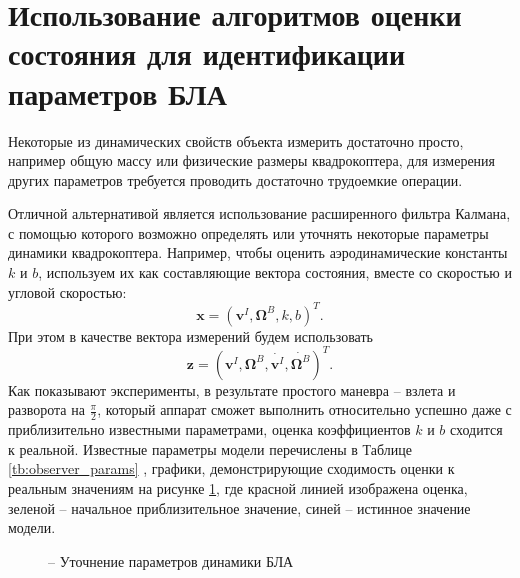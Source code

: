 \section{Использование алгоритмов оценки состояния для идентификации параметров БЛА}

Некоторые из динамических свойств объекта измерить достаточно просто, например общую массу или физические размеры квадрокоптера, для измерения других параметров требуется проводить достаточно трудоемкие операции.

Отличной альтернативой является использование расширенного фильтра Калмана, с помощью которого возможно определять или уточнять некоторые параметры динамики квадрокоптера. Например, чтобы оценить аэродинамические константы $k$ и $b$, используем их как составляющие вектора состояния, вместе со скоростью и угловой скоростью:
\begin{equation}
\bm x = (\bm v^I, \bm \Omega^B, k, b)^T.
\end{equation}
При этом в качестве вектора измерений будем использовать
\begin{equation}
\bm z = (\bm v^I, \bm \Omega^B, \dot{\bm v^I}, \dot{\bm \Omega^B})^T.
\end{equation}
Как показывают эксперименты, в результате простого маневра -- взлета и разворота на $\frac{\pi}{2}$, который аппарат сможет выполнить относительно успешно даже с приблизительно известными параметрами, оценка коэффициентов $k$ и $b$
сходится к реальной. Известные параметры модели перечислены в Таблице \ref{tb:observer_params} , графики, демонстрирующие сходимость оценки к реальным значениям на рисунке \ref{fig:observer_k_b}, где красной линией изображена оценка, зеленой -- начальное приблизительное значение, синей -- истинное значение модели.
\begin{figure}[h!]
	\centering
	\quad
	\caption{ -- Уточнение параметров динамики БЛА}
	\label{fig:observer_k_b}
\end{figure}
